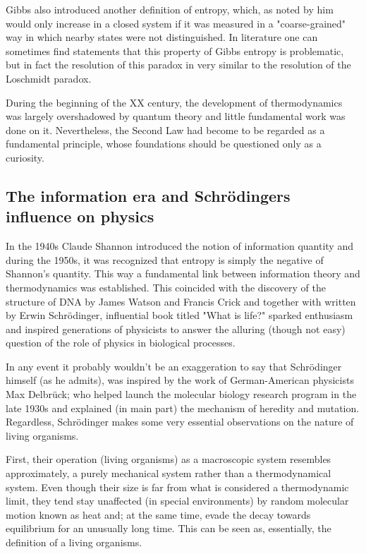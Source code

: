 \documentclass[a4paper,12pt]{article}
\begin{document}
Gibbs also introduced another definition of entropy, which, as noted by him \cite{Gibbs:1928tw} would only increase in a closed system if it was measured in a "coarse-grained" way in which nearby states were not distinguished. In literature one can sometimes find statements \cite{Evans:2016tq} that this property of Gibbs entropy is problematic, but in fact the resolution of this paradox in very similar to the resolution of the Loschmidt paradox.

During the beginning of the XX century, the development of thermodynamics was largely overshadowed by quantum theory and little fundamental work was done on it. 
Nevertheless, the Second Law had become to be regarded as a fundamental principle, whose foundations should be questioned only as a curiosity\cite{Wolfram:552851}.

\subsection{The information era and Schrödingers influence on physics}

In the 1940s Claude Shannon introduced the notion of information quantity \cite{Shannon:429164} and during the 1950s, it was recognized that entropy is simply the negative of Shannon's quantity. This way a fundamental link between information theory and thermodynamics was established. This coincided with the discovery of the structure of DNA by James Watson and Francis Crick and together with written by Erwin Schrödinger, influential book titled "What is life?" sparked enthusiasm and inspired generations of physicists to answer the alluring (though not easy) question of the role of physics in biological processes. 

In any event it probably wouldn't be an exaggeration to say that Schrödinger himself (as he admits), was inspired by the work of German-American physicists Max Delbrück; who helped launch the molecular biology research program in the late 1930s and explained (in main part) the mechanism of heredity and mutation.
Regardless, Schrödinger makes some very essential observations on the nature of living organisms.

First, their operation (living organisms) as a macroscopic system resembles approximately, a purely mechanical system rather than a thermodynamical system. 
Even though their size is far from what is considered a thermodynamic limit, they tend stay unaffected (in special environments) by random molecular motion known as heat and; at the same time, evade the decay towards equilibrium for an unusually long time. This can be seen as, essentially, the definition of a living organisms.
\end{document}
